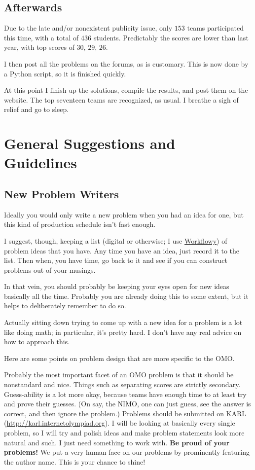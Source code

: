\documentclass[11pt]{scrreprt}
\begin{document}
\section{Afterwards}
Due to the late and/or nonexistent publicity issue,
only $153$ teams participated this time, with a total of $436$ students.
Predictably the scores are lower than last year, with top scores of $30$, $29$, $26$.

I then post all the problems on the forums, as is customary.
This is now done by a Python script, so it is finished quickly.

At this point I finish up the solutions, compile the results, and post them on the website.
The top seventeen teams are recognized, as usual.
I breathe a sigh of relief and go to sleep.


\chapter{General Suggestions and Guidelines}
\section{New Problem Writers}
Ideally you would only write a new problem when you had an idea for one, but this kind of production schedule isn't fast enough.

I suggest, though, keeping a list (digital or otherwise; I use \href{http://www.workflowy.com}{Workflowy}) of problem ideas that you have. Any time you have an idea, just record it to the list. Then when, you have time, go back to it and see if you can construct problems out of your musings.

In that vein, you should probably be keeping your eyes open for new ideas basically all the time. Probably you are already doing this to some extent, but it helps to deliberately remember to do so.

Actually sitting down trying to come up with a new idea for a problem is a lot like doing math; in particular, it's pretty hard. I don't have any real advice on how to approach this.

Here are some points on problem design that are more specific to the OMO.
\begin{enumerate}
  \ii Probably the most important facet of an OMO problem is that it should be nonstandard and nice. Things such as separating scores are strictly secondary.
  \ii Guess-ability is a lot more okay, because teams have enough time to at least try and prove their guesses. (On say, the NIMO, one can just guess, see the answer is correct, and then ignore the problem.)
  \ii Problems should be submitted on KARL (\url{http://karl.internetolympiad.org}).
  \ii I will be looking at basically every single problem, so I will try and polish ideas and make problem statements look more natural and such. I just need something to work with.
  \ii \textbf{Be proud of your problems!} We put a very human face on our problems by prominently featuring the author name. This is your chance to shine!
\end{enumerate}
\end{document}
